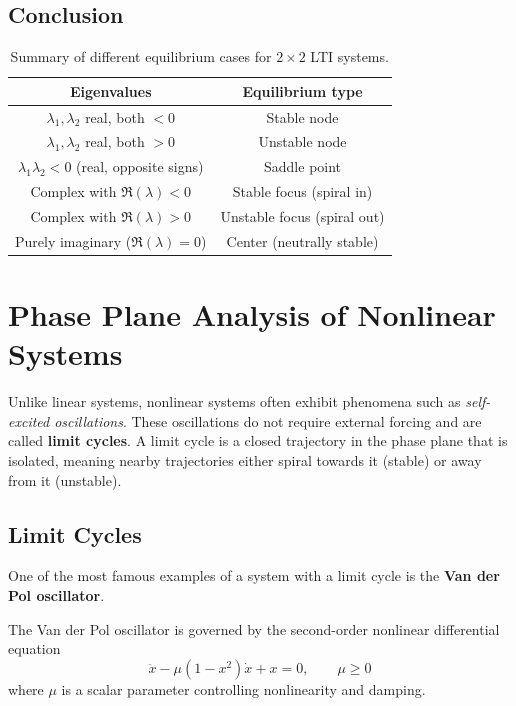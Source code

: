 \subsection{Conclusion}
\begin{table}[h!]
    \centering
    \begin{tabular}{|c|c|}\hline
         \textbf{Eigenvalues} & \textbf{Equilibrium type} \\\hline
         $\lambda_1,\lambda_2$ real, both $<0$ & Stable node \\\hline
         $\lambda_1,\lambda_2$ real, both $>0$ & Unstable node \\\hline
         $\lambda_1\lambda_2 < 0$ (real, opposite signs) & Saddle point \\\hline
         Complex with $\Re(\lambda)<0$ & Stable focus (spiral in) \\\hline
         Complex with $\Re(\lambda)>0$ & Unstable focus (spiral out) \\\hline
         Purely imaginary ($\Re(\lambda)=0$) & Center (neutrally stable) \\\hline
    \end{tabular}
    \caption{Summary of different equilibrium cases for $2\times2$ LTI systems.}
    \label{tab:lti_summary}
\end{table}

\section{Phase Plane Analysis of Nonlinear Systems}

Unlike linear systems, nonlinear systems often exhibit phenomena such as 
\emph{self-excited oscillations}. These oscillations do not require external forcing
and are called \textbf{limit cycles}. A limit cycle is a closed trajectory in the 
phase plane that is isolated, meaning nearby trajectories either spiral towards it 
(stable) or away from it (unstable). 

\subsection{Limit Cycles}

One of the most famous examples of a system with a limit cycle is the 
\textbf{Van der Pol oscillator}.

\begin{definition}
    The Van der Pol oscillator is governed by the second-order nonlinear differential equation
    \begin{equation}
        \ddot{x} - \mu(1-x^2)\dot{x} + x = 0, \qquad \mu \geq 0
    \end{equation}
    where $\mu$ is a scalar parameter controlling nonlinearity and damping.
\end{definition}

